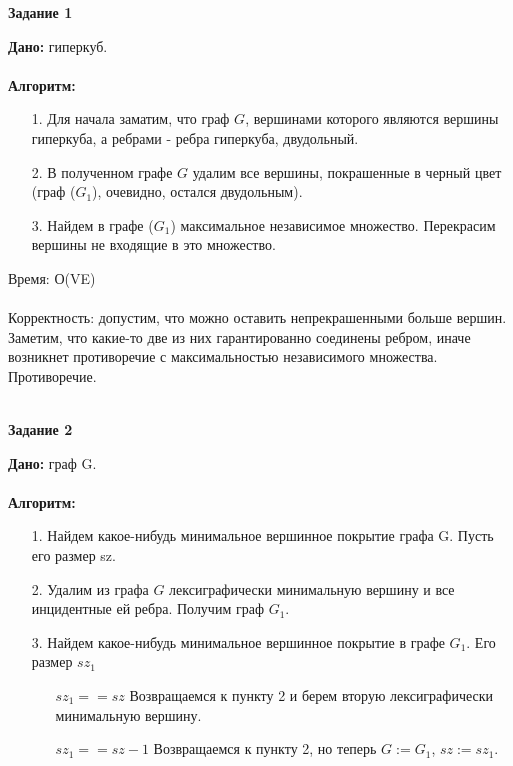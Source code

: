 \documentclass[12pt]{article} %
\begin{document}
	\begin{center}
		\textbf{Задание 1}\\
	\end{center}
	\textbf{Дано:} гиперкуб.\\
	\\
	\textbf{Алгоритм:}
	\begin{enumerate}
		\item[1.] Для начала заматим, что граф $G$, вершинами которого являются вершины гиперкуба, а ребрами - ребра гиперкуба, двудольный.
		\item[2.] В полученном графе $G$ удалим все вершины, покрашенные в черный цвет (граф ($G_1$), очевидно, остался двудольным).
		\item[3.] Найдем в графе ($G_1$) максимальное независимое множество. Перекрасим вершины не входящие в это множество.
	\end{enumerate}
	Время: О(VE)\\
	\\
	Корректность: допустим, что можно оставить непрекрашенными больше вершин. Заметим, что какие-то две из них гарантированно соединены ребром,
	иначе возникнет противоречие с максимальностью независимого множества. Противоречие.\\
	\\
	\begin{center}
		\textbf{Задание 2}\\
	\end{center}
	\textbf{Дано:} граф G.\\
	\\
	\textbf{Алгоритм:}\\
	\begin{enumerate}
		\item[1.] Найдем какое-нибудь минимальное вершинное покрытие графа G. Пусть его размер sz.
		\item[2.] Удалим из графа $G$ лексиграфически минимальную вершину и все инцидентные ей ребра. Получим граф $G_1$.
		\item[3.] Найдем какое-нибудь минимальное вершинное покрытие в графе $G_1$. Его размер $sz_1$
		\begin{enumerate}
			\item[$sz_1 == sz$] Возвращаемся к пункту 2 и берем вторую лексиграфически минимальную вершину.\\
			\item[$sz_1 == sz - 1$] Возвращаемся к пункту 2, но теперь $G := G_1$, $sz := sz_1$.
		\end{enumerate}
	\end{enumerate}
\end{document}
